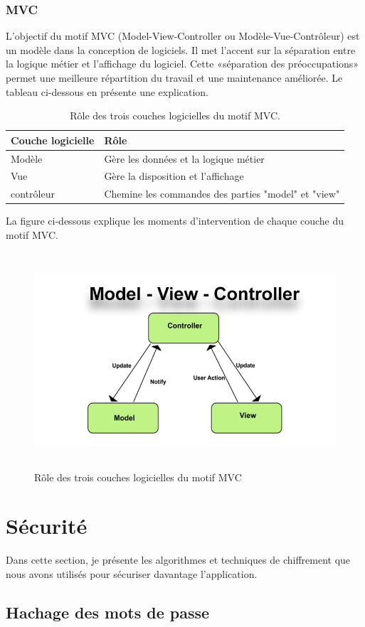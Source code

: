\subsubsection{MVC}
\label{3.3.3.1}
L'objectif du motif MVC (Model-View-Controller ou Modèle-Vue-Contrôleur) est un modèle dans la conception de logiciels. Il met l'accent sur la séparation entre la logique métier et l'affichage du logiciel. Cette «séparation des préoccupations» permet une meilleure répartition du travail et une maintenance améliorée. Le tableau ci-dessous en présente une explication.
\newline\newline
\begin{table}[h]
	\begin{tabular}{|m{6cm}|m{10cm}|}
		\hline
		\textbf{Couche logicielle} & \textbf{Rôle} \\
		\hline
		Modèle & Gère les données et la logique métier \\
		\hline
		Vue & Gère la disposition et l'affichage \\
		\hline
		contrôleur & Chemine les commandes des parties "model" et "view" \\
		\hline
	\end{tabular}
	\caption{Rôle des trois couches logicielles du motif MVC.}
\end{table}
\newline La figure ci-dessous explique les moments d'intervention de chaque couche du motif MVC.
\begin{figure}[h]
	\includegraphics[width=15cm, height=8cm]{./Template LaTeX/Images/mvc2.png}
	\centering
	\caption{Rôle des trois couches logicielles du motif MVC}
\end{figure}
\section{Sécurité}
Dans cette section, je présente les algorithmes et techniques de chiffrement que nous avons
utilisés pour sécuriser davantage l'application.
\subsection{Hachage des mots de passe}